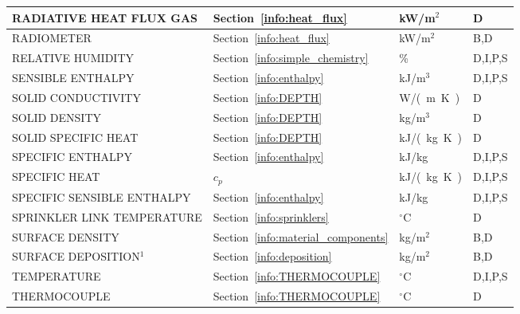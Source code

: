 \documentclass[11pt]{book}
\begin{document}
\begin{longtable}{@{\extracolsep{\fill}}|l|l|l|l|}
{\ct RADIATIVE HEAT FLUX GAS}                   & Section~\ref{info:heat_flux}                  & kW/m$^2$       & D            \\ \hline
{\ct RADIOMETER}                                & Section~\ref{info:heat_flux}                  & kW/m$^2$       & B,D          \\ \hline
{\ct RELATIVE HUMIDITY}                         & Section~\ref{info:simple_chemistry}           & \%             & D,I,P,S      \\ \hline
{\ct SENSIBLE ENTHALPY}                         & Section~\ref{info:enthalpy}                   & kJ/m$^3$       & D,I,P,S      \\ \hline
{\ct SOLID CONDUCTIVITY}                        & Section~\ref{info:DEPTH}                      & \si{W/(m.K)}   & D            \\ \hline
{\ct SOLID DENSITY}                             & Section~\ref{info:DEPTH}                      & kg/m$^3$       & D            \\ \hline
{\ct SOLID SPECIFIC HEAT}                       & Section~\ref{info:DEPTH}                      & \si{kJ/(kg.K)} & D            \\ \hline
{\ct SPECIFIC ENTHALPY}                         & Section~\ref{info:enthalpy}                   & kJ/kg          & D,I,P,S      \\ \hline
{\ct SPECIFIC HEAT}                             & $c_p$                                         & \si{kJ/(kg.K)} & D,I,P,S      \\ \hline
{\ct SPECIFIC SENSIBLE ENTHALPY}                & Section~\ref{info:enthalpy}                   & kJ/kg          & D,I,P,S      \\ \hline
{\ct SPRINKLER LINK TEMPERATURE}                & Section~\ref{info:sprinklers}                 & $^\circ$C      & D            \\ \hline
{\ct SURFACE DENSITY}                           & Section~\ref{info:material_components}        & kg/m$^2$       & B,D          \\ \hline
{\ct SURFACE DEPOSITION}$^1$                    & Section~\ref{info:deposition}                 & kg/m$^2$       & B,D          \\ \hline
{\ct TEMPERATURE}                               & Section~\ref{info:THERMOCOUPLE}               & $^\circ$C      & D,I,P,S      \\ \hline
{\ct THERMOCOUPLE}                              & Section~\ref{info:THERMOCOUPLE}               & $^\circ$C      & D            \\ \hline

\end{longtable}
\end{document}

